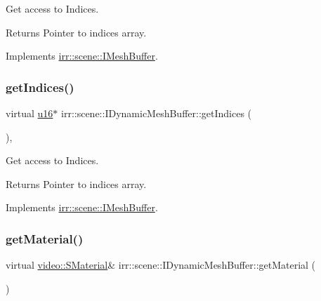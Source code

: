 Get access to Indices. 

\begin{DoxyReturn}{Returns}
Pointer to indices array. 
\end{DoxyReturn}


Implements \hyperlink{classirr_1_1scene_1_1IMeshBuffer_a76c0013378012af7aeb6cb8f4ea8f9a1}{irr\+::scene\+::\+I\+Mesh\+Buffer}.

\mbox{\label{classirr_1_1scene_1_1IDynamicMeshBuffer_a556d8107ac44cbb16892f54370e32812}} 
\subsubsection{\texorpdfstring{get\+Indices()}{getIndices()}\hspace{0.1cm}{\footnotesize\ttfamily [2/2]}}
{\footnotesize\ttfamily virtual \hyperlink{namespaceirr_ae9f8ec82692ad3b83c21f555bfa70bcc}{u16}$\ast$ irr\+::scene\+::\+I\+Dynamic\+Mesh\+Buffer\+::get\+Indices (\begin{DoxyParamCaption}{ }\end{DoxyParamCaption})\hspace{0.3cm}{\ttfamily [inline]}, {\ttfamily [virtual]}}



Get access to Indices. 

\begin{DoxyReturn}{Returns}
Pointer to indices array. 
\end{DoxyReturn}


Implements \hyperlink{classirr_1_1scene_1_1IMeshBuffer_a3d33a561023314677361e30cf07ae429}{irr\+::scene\+::\+I\+Mesh\+Buffer}.

\mbox{\label{classirr_1_1scene_1_1IDynamicMeshBuffer_a6ed3a5ce948ebef063b7ea9e07974eb7}} 
\subsubsection{\texorpdfstring{get\+Material()}{getMaterial()}\hspace{0.1cm}{\footnotesize\ttfamily [1/2]}}
{\footnotesize\ttfamily virtual \hyperlink{classirr_1_1video_1_1SMaterial}{video\+::\+S\+Material}\& irr\+::scene\+::\+I\+Dynamic\+Mesh\+Buffer\+::get\+Material (\begin{DoxyParamCaption}{ }\end{DoxyParamCaption})\hspace{0.3cm}{\ttfamily [pure virtual]}}



